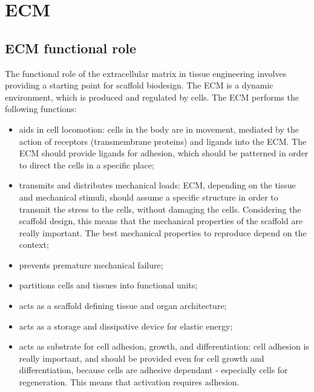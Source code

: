 \graphicspath{{chapters/ecm/}}
\chapter{ECM}

\section{ECM functional role}
The functional role of the extracellular matrix in tissue engineering involves providing a starting point for scaffold biodesign.
The ECM is a dynamic environment, which is produced and regulated by cells.
The ECM performs the following functions:

\begin{multicols}{2}
	\begin{itemize}
		\item aids in cell locomotion: cells in the body are in movement, mediated by the action of receptors (transmembrane proteins) and ligands into the ECM. The ECM should provide ligands for adhesion, which should be patterned in order to direct the cells in a specific place;
		\item transmits and distributes mechanical loads: ECM, depending on the tissue and mechanical stimuli, should assume a specific structure in order to transmit the stress to the cells, without damaging the cells. Considering the scaffold design, this means that the mechanical properties of the scaffold are really important. The best mechanical properties to reproduce depend on the context;
		\item prevents premature mechanical failure;
		\item partitions cells and tissues into functional units;
		\item acts as a scaffold defining tissue and organ architecture;
		\item acts as a storage and dissipative device for elastic energy;
		\item acts as substrate for cell adhesion, growth, and differentiation: cell adhesion is really important, and should be provided even for cell growth and differentiation, because cells are adhesive dependant - especially cells for regeneration. This means that activation requires adhesion.
	\end{itemize}
\end{multicols}

